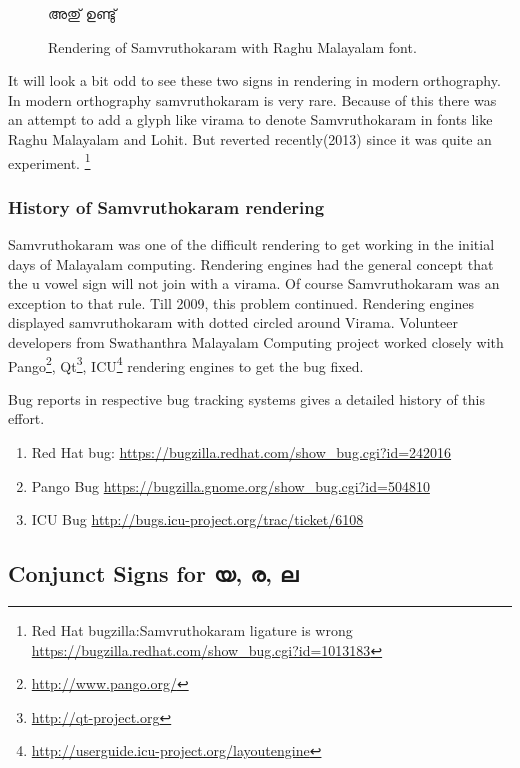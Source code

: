 \begin{figure}[h!]
  \centering
  {\raghumalayalam\textexample  അതു് ഉണ്ടു് }\\
  \caption{Rendering of Samvruthokaram with Raghu Malayalam font.}
  \label{SamvruthokaramModern}
\end{figure}

It will look a bit odd to see these two signs in rendering in modern
orthography. In modern orthography samvruthokaram is very rare. Because of this
there was an attempt to add a glyph like virama to denote Samvruthokaram in
fonts like Raghu Malayalam and Lohit. But reverted recently(2013) since it
was quite an experiment. \footnote{Red Hat bugzilla:Samvruthokaram ligature is
wrong \url{https://bugzilla.redhat.com/show_bug.cgi?id=1013183}}

\subsubsection{History of Samvruthokaram rendering}

Samvruthokaram was one of the difficult rendering to get working in the initial
days of Malayalam computing. Rendering engines had the general concept that the
u vowel sign will not join with a virama. Of course Samvruthokaram was an
exception to that rule. Till 2009, this problem continued. Rendering engines
displayed samvruthokaram with dotted circled around Virama.
Volunteer developers from Swathanthra Malayalam Computing project worked
closely with Pango\footnote{\url{http://www.pango.org/}},
Qt\footnote{\url{http://qt-project.org}},
ICU\footnote{\url{http://userguide.icu-project.org/layoutengine}} rendering
engines to get the bug fixed.

Bug reports in respective bug tracking systems gives a detailed history of this
effort.

\begin{enumerate}
  \item Red Hat bug: \url{https://bugzilla.redhat.com/show_bug.cgi?id=242016}
  \item Pango Bug \url{https://bugzilla.gnome.org/show_bug.cgi?id=504810}
  \item ICU Bug \url{http://bugs.icu-project.org/trac/ticket/6108}
\end{enumerate}

\subsection {Conjunct Signs for യ, ര, ല}

